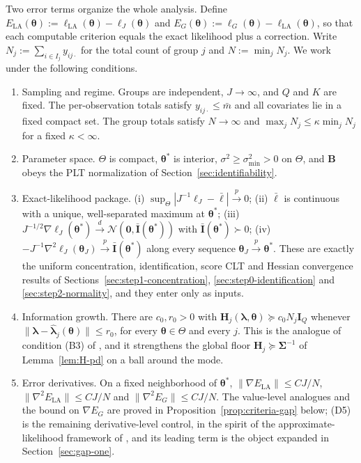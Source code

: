 Two error terms organize the whole analysis. Define $E_{\text{LA}}(\bm{\theta}):=\ell_{\text{LA}}(\bm{\theta})-\ell_{J}(\bm{\theta})$ and $E_{G}(\bm{\theta}):=\ell_{G}(\bm{\theta})-\ell_{\text{LA}}(\bm{\theta})$, so that each computable criterion equals the exact likelihood plus a correction. Write $N_{j}:=\sum_{i\in I_{j}}y_{ij\cdot}$ for the total count of group $j$ and $N:=\min_{j}N_{j}$. We work under the following conditions.
\begin{enumerate}
    \item[(D1)] Sampling and regime. Groups are independent, $J\to\infty$, and $Q$ and $K$ are fixed. The per-observation totals satisfy $y_{ij\cdot}\leq\bar{m}$ and all covariates lie in a fixed compact set. The group totals satisfy $N\to\infty$ and $\max_{j}N_{j}\leq\kappa\min_{j}N_{j}$ for a fixed $\kappa<\infty$.
    \item[(D2)] Parameter space. $\Theta$ is compact, $\bm{\theta}^{*}$ is interior, $\sigma^{2}\geq\sigma^{2}_{\min}>0$ on $\Theta$, and $\mathbf{B}$ obeys the PLT normalization of Section~\ref{sec:identifiability}.
    \item[(D3)] Exact-likelihood package. (i) $\sup_{\Theta}|J^{-1}\ell_{J}-\bar{\ell}|\xrightarrow{p}0$; (ii) $\bar{\ell}$ is continuous with a unique, well-separated maximum at $\bm{\theta}^{*}$; (iii) $J^{-1/2}\nabla\ell_{J}(\bm{\theta}^{*})\xrightarrow{d}\mathcal{N}(\bm{0},\bar{\mathbf{I}}(\bm{\theta}^{*}))$ with $\bar{\mathbf{I}}(\bm{\theta}^{*})\succ0$; (iv) $-J^{-1}\nabla^{2}\ell_{J}(\bm{\theta}_{J})\xrightarrow{p}\bar{\mathbf{I}}(\bm{\theta}^{*})$ along every sequence $\bm{\theta}_{J}\xrightarrow{p}\bm{\theta}^{*}$. These are exactly the uniform concentration, identification, score CLT and Hessian convergence results of Sections~\ref{sec:step1-concentration}, \ref{sec:step0-identification} and \ref{sec:step2-normality}, and they enter only as inputs.
    \item[(D4)] Information growth. There are $c_{0},r_{0}>0$ with $\mathbf{H}_{j}(\bm{\lambda},\bm{\theta})\succeq c_{0}N_{j}\mathbf{I}_{Q}$ whenever $\|\bm{\lambda}-\hat{\bm{\lambda}}_{j}(\bm{\theta})\|\leq r_{0}$, for every $\bm{\theta}\in\Theta$ and every $j$. This is the analogue of condition (B3) of \citet{Yue2026}, and it strengthens the global floor $\mathbf{H}_{j}\succeq\bm{\Sigma}^{-1}$ of Lemma~\ref{lem:H-pd} on a ball around the mode.
    \item[(D5)] Error derivatives. On a fixed neighborhood of $\bm{\theta}^{*}$, $\|\nabla E_{\text{LA}}\|\leq CJ/N$, $\|\nabla^{2}E_{\text{LA}}\|\leq CJ/N$ and $\|\nabla^{2}E_{G}\|\leq CJ/N$. The value-level analogues and the bound on $\nabla E_{G}$ are proved in Proposition~\ref{prop:criteria-gap} below; (D5) is the remaining derivative-level control, in the spirit of the approximate-likelihood framework of \citet{Ogden2017}, and its leading term is the object expanded in Section~\ref{sec:gap-one}.
\end{enumerate}

